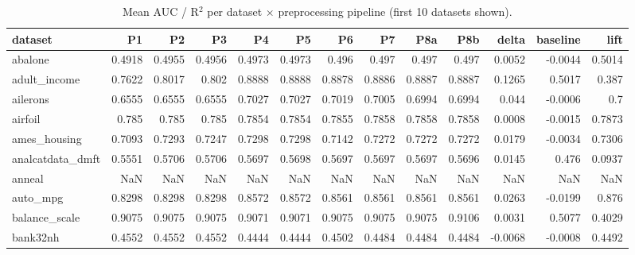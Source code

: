 \begin{table}
\caption{Mean AUC / R$^2$ per dataset $\times$ preprocessing pipeline (first 10 datasets shown).}
\label{tab:per_dataset_pipeline}
\begin{tabular}{lrrrrrrrrrrrr}
\toprule
dataset & P1 & P2 & P3 & P4 & P5 & P6 & P7 & P8a & P8b & delta & baseline & lift \\
\midrule
abalone & 0.4918 & 0.4955 & 0.4956 & 0.4973 & 0.4973 & 0.496 & 0.497 & 0.497 & 0.497 & 0.0052 & -0.0044 & 0.5014 \\
adult\_income & 0.7622 & 0.8017 & 0.802 & 0.8888 & 0.8888 & 0.8878 & 0.8886 & 0.8887 & 0.8887 & 0.1265 & 0.5017 & 0.387 \\
ailerons & 0.6555 & 0.6555 & 0.6555 & 0.7027 & 0.7027 & 0.7019 & 0.7005 & 0.6994 & 0.6994 & 0.044 & -0.0006 & 0.7 \\
airfoil & 0.785 & 0.785 & 0.785 & 0.7854 & 0.7854 & 0.7855 & 0.7858 & 0.7858 & 0.7858 & 0.0008 & -0.0015 & 0.7873 \\
ames\_housing & 0.7093 & 0.7293 & 0.7247 & 0.7298 & 0.7298 & 0.7142 & 0.7272 & 0.7272 & 0.7272 & 0.0179 & -0.0034 & 0.7306 \\
analcatdata\_dmft & 0.5551 & 0.5706 & 0.5706 & 0.5697 & 0.5698 & 0.5697 & 0.5697 & 0.5697 & 0.5696 & 0.0145 & 0.476 & 0.0937 \\
anneal & NaN & NaN & NaN & NaN & NaN & NaN & NaN & NaN & NaN & NaN & NaN & NaN \\
auto\_mpg & 0.8298 & 0.8298 & 0.8298 & 0.8572 & 0.8572 & 0.8561 & 0.8561 & 0.8561 & 0.8561 & 0.0263 & -0.0199 & 0.876 \\
balance\_scale & 0.9075 & 0.9075 & 0.9075 & 0.9071 & 0.9071 & 0.9075 & 0.9075 & 0.9075 & 0.9106 & 0.0031 & 0.5077 & 0.4029 \\
bank32nh & 0.4552 & 0.4552 & 0.4552 & 0.4444 & 0.4444 & 0.4502 & 0.4484 & 0.4484 & 0.4484 & -0.0068 & -0.0008 & 0.4492 \\
\bottomrule
\end{tabular}
\end{table}
